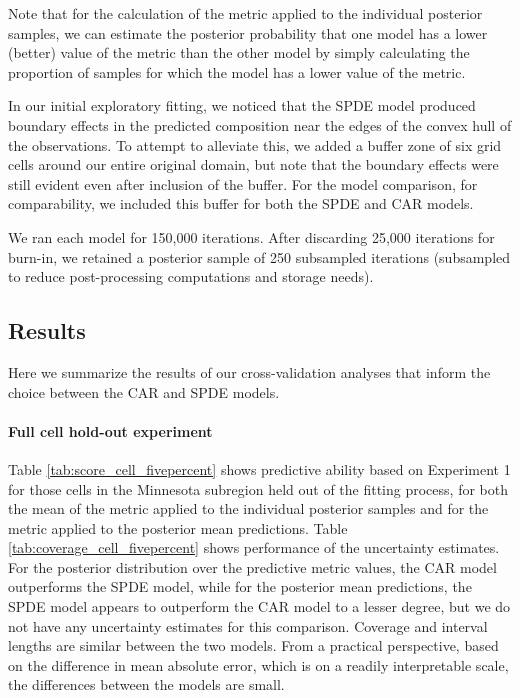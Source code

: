 \documentclass[12pt]{article}\usepackage[]{graphicx}\usepackage[]{color}
\begin{document}
Note that for the calculation of the metric applied to the individual
posterior samples, we can estimate the posterior probability that
one model has a lower (better) value of the metric than the other
model by simply calculating the proportion of samples for which the
model has a lower value of the metric.

In our initial exploratory fitting, we noticed that the SPDE model
produced boundary effects in the predicted composition near the edges
of the convex hull of the observations. To attempt to alleviate this,
we added a buffer zone of six grid cells around our entire original
domain, but note that the boundary effects were still evident even
after inclusion of the buffer. For the model comparison, for comparability,
we included this buffer for both the SPDE and CAR models. 

We ran each model for 150,000 iterations. After discarding 25,000
iterations for burn-in, we retained a posterior sample of 250 subsampled
iterations (subsampled to reduce post-processing computations and
storage needs). 





\subsection{Results}

Here we summarize the results of our cross-validation analyses that
inform the choice between the CAR and SPDE models. 


\paragraph{Full cell hold-out experiment}

Table \ref{tab:score_cell_fivepercent} shows predictive ability based
on Experiment 1 for those cells in the Minnesota subregion held out
of the fitting process, for both the mean of the metric applied to
the individual posterior samples and for the metric applied to the
posterior mean predictions. Table \ref{tab:coverage_cell_fivepercent}
shows performance of the uncertainty estimates. For the posterior
distribution over the predictive metric values, the CAR model outperforms
the SPDE model, while for the posterior mean predictions, the SPDE
model appears to outperform the CAR model to a lesser degree, but
we do not have any uncertainty estimates for this comparison. Coverage
and interval lengths are similar between the two models. From a practical
perspective, based on the difference in mean absolute error, which
is on a readily interpretable scale, the differences between the models
are small. 
\end{document}
